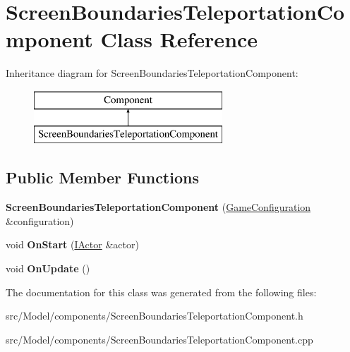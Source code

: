 \hypertarget{classScreenBoundariesTeleportationComponent}{}\section{Screen\+Boundaries\+Teleportation\+Component Class Reference}
\label{classScreenBoundariesTeleportationComponent}
Inheritance diagram for Screen\+Boundaries\+Teleportation\+Component\+:\begin{figure}[H]
\begin{center}
\leavevmode
\includegraphics[height=2.000000cm]{classScreenBoundariesTeleportationComponent}
\end{center}
\end{figure}
\subsection*{Public Member Functions}
\begin{DoxyCompactItemize}
\item 
{\bfseries Screen\+Boundaries\+Teleportation\+Component} (\hyperlink{classGameConfiguration}{Game\+Configuration} \&configuration)\hypertarget{classScreenBoundariesTeleportationComponent_a5d72cfabf9989a94675c724685ca1f5b}{}\label{classScreenBoundariesTeleportationComponent_a5d72cfabf9989a94675c724685ca1f5b}

\item 
void {\bfseries On\+Start} (\hyperlink{classIActor}{I\+Actor} \&actor)\hypertarget{classScreenBoundariesTeleportationComponent_aee4d63bba1aa116796c7c224a136bb95}{}\label{classScreenBoundariesTeleportationComponent_aee4d63bba1aa116796c7c224a136bb95}

\item 
void {\bfseries On\+Update} ()\hypertarget{classScreenBoundariesTeleportationComponent_ad382082c6d7d5ea1e1ee8ac5f4ea0676}{}\label{classScreenBoundariesTeleportationComponent_ad382082c6d7d5ea1e1ee8ac5f4ea0676}

\end{DoxyCompactItemize}


The documentation for this class was generated from the following files\+:\begin{DoxyCompactItemize}
\item 
src/\+Model/components/Screen\+Boundaries\+Teleportation\+Component.\+h\item 
src/\+Model/components/Screen\+Boundaries\+Teleportation\+Component.\+cpp\end{DoxyCompactItemize}
